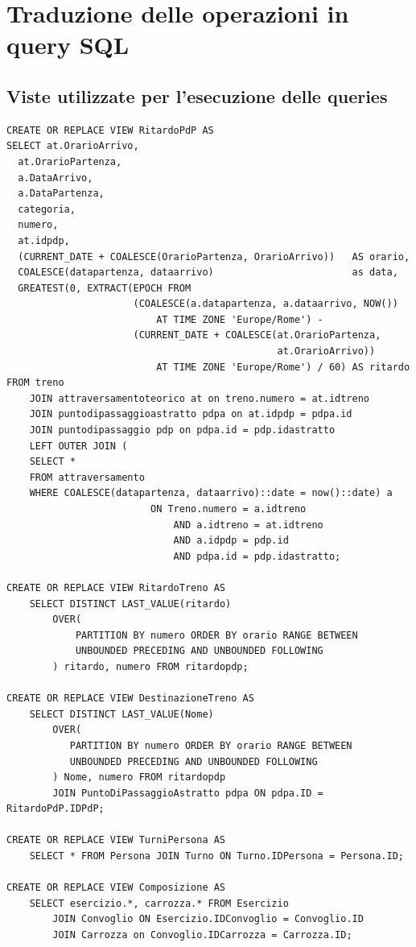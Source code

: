 \documentclass[a4paper,12pt]{report}
\begin{document}
	\section{Traduzione delle operazioni in query SQL}
	\subsection{Viste utilizzate per l'esecuzione delle queries}
	\begin{verbatim}
CREATE OR REPLACE VIEW RitardoPdP AS
SELECT at.OrarioArrivo,
  at.OrarioPartenza,
  a.DataArrivo,
  a.DataPartenza,
  categoria,
  numero,
  at.idpdp,
  (CURRENT_DATE + COALESCE(OrarioPartenza, OrarioArrivo))   AS orario,
  COALESCE(datapartenza, dataarrivo)                        as data,
  GREATEST(0, EXTRACT(EPOCH FROM
                      (COALESCE(a.datapartenza, a.dataarrivo, NOW())
                          AT TIME ZONE 'Europe/Rome') -
                      (CURRENT_DATE + COALESCE(at.OrarioPartenza,
                                               at.OrarioArrivo))
                          AT TIME ZONE 'Europe/Rome') / 60) AS ritardo
FROM treno
    JOIN attraversamentoteorico at on treno.numero = at.idtreno
    JOIN puntodipassaggioastratto pdpa on at.idpdp = pdpa.id
    JOIN puntodipassaggio pdp on pdpa.id = pdp.idastratto
    LEFT OUTER JOIN (
    SELECT *
    FROM attraversamento
    WHERE COALESCE(datapartenza, dataarrivo)::date = now()::date) a
                         ON Treno.numero = a.idtreno
                             AND a.idtreno = at.idtreno
                             AND a.idpdp = pdp.id
                             AND pdpa.id = pdp.idastratto;

CREATE OR REPLACE VIEW RitardoTreno AS
    SELECT DISTINCT LAST_VALUE(ritardo)
        OVER(
            PARTITION BY numero ORDER BY orario RANGE BETWEEN
            UNBOUNDED PRECEDING AND UNBOUNDED FOLLOWING
        ) ritardo, numero FROM ritardopdp;

CREATE OR REPLACE VIEW DestinazioneTreno AS
    SELECT DISTINCT LAST_VALUE(Nome)
        OVER(
           PARTITION BY numero ORDER BY orario RANGE BETWEEN
           UNBOUNDED PRECEDING AND UNBOUNDED FOLLOWING
        ) Nome, numero FROM ritardopdp
        JOIN PuntoDiPassaggioAstratto pdpa ON pdpa.ID = RitardoPdP.IDPdP;

CREATE OR REPLACE VIEW TurniPersona AS
    SELECT * FROM Persona JOIN Turno ON Turno.IDPersona = Persona.ID;

CREATE OR REPLACE VIEW Composizione AS
    SELECT esercizio.*, carrozza.* FROM Esercizio
        JOIN Convoglio ON Esercizio.IDConvoglio = Convoglio.ID
        JOIN Carrozza on Convoglio.IDCarrozza = Carrozza.ID;
	\end{verbatim}
\end{document}
